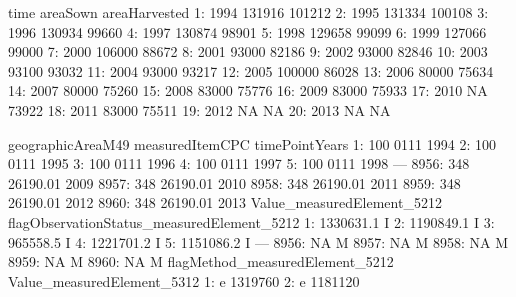 \documentclass[nojss]{jss}
\begin{document}
\begin{Schunk}
\begin{Soutput}
    time areaSown areaHarvested
 1: 1994   131916        101212
 2: 1995   131334        100108
 3: 1996   130934         99660
 4: 1997   130874         98901
 5: 1998   129658         99099
 6: 1999   127066         99000
 7: 2000   106000         88672
 8: 2001    93000         82186
 9: 2002    93000         82846
10: 2003    93100         93032
11: 2004    93000         93217
12: 2005   100000         86028
13: 2006    80000         75634
14: 2007    80000         75260
15: 2008    83000         75776
16: 2009    83000         75933
17: 2010       NA         73922
18: 2011    83000         75511
19: 2012       NA            NA
20: 2013       NA            NA
\end{Soutput}
\begin{Soutput}
      geographicAreaM49 measuredItemCPC timePointYears
   1:               100            0111           1994
   2:               100            0111           1995
   3:               100            0111           1996
   4:               100            0111           1997
   5:               100            0111           1998
  ---                                                 
8956:               348        26190.01           2009
8957:               348        26190.01           2010
8958:               348        26190.01           2011
8959:               348        26190.01           2012
8960:               348        26190.01           2013
      Value_measuredElement_5212 flagObservationStatus_measuredElement_5212
   1:                  1330631.1                                          I
   2:                  1190849.1                                          I
   3:                   965558.5                                          I
   4:                  1221701.2                                          I
   5:                  1151086.2                                          I
  ---                                                                      
8956:                         NA                                          M
8957:                         NA                                          M
8958:                         NA                                          M
8959:                         NA                                          M
8960:                         NA                                          M
      flagMethod_measuredElement_5212 Value_measuredElement_5312
   1:                               e                    1319760
   2:                               e                    1181120

\end{Soutput}
\end{Schunk}
\end{document}

